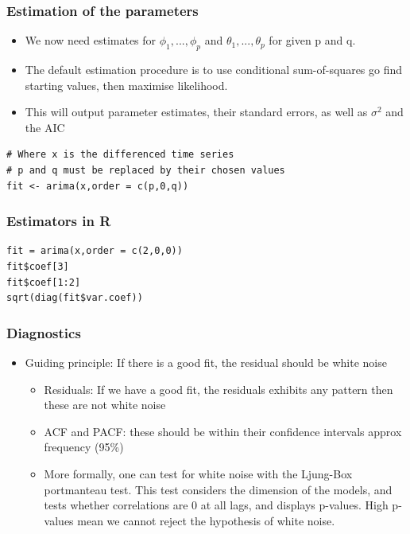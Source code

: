 \documentclass{article}
\begin{document}
\subsubsection{Estimation of the parameters}
\begin{itemize}
    \item We now need estimates for $\phi_1, ..., \phi_p$ and $\theta_1, ..., \theta_p$ for given p and q.
    \item The default estimation procedure is to use conditional sum-of-squares go find starting values, then maximise likelihood.
    \item This will output parameter estimates, their standard errors, as well as $\sigma^2$ and the AIC
\end{itemize}

\begin{lstlisting}
# Where x is the differenced time series
# p and q must be replaced by their chosen values
fit <- arima(x,order = c(p,0,q)) 
\end{lstlisting}


\subsubsection{Estimators in R}
\begin{lstlisting}
fit = arima(x,order = c(2,0,0))
fit$coef[3]
fit$coef[1:2]
sqrt(diag(fit$var.coef))
\end{lstlisting}


\subsubsection{Diagnostics}
\begin{itemize}
    \item Guiding principle: If there is a good fit, the residual should be white noise
    \begin{itemize}
        \item Residuals: If we have a good fit, the residuals exhibits any pattern then these are not white noise
        \item ACF and PACF: these should be within their confidence intervals approx frequency (95\%)
        \item More formally, one can test for white noise with the Ljung-Box portmanteau test. This test considers the dimension of the models, and tests whether correlations are 0 at all lags, and displays p-values. High p-values mean we cannot reject the hypothesis of white noise.
    \end{itemize}
\end{itemize}
\end{document}

